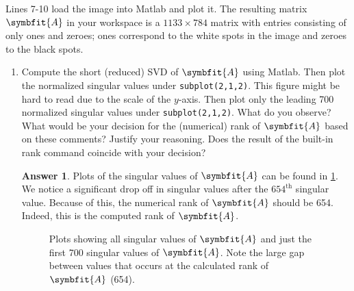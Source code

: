 \documentclass{article}
\theoremstyle{definition}
\newtheorem*{answer}{Answer}
\newcommand{\mat}[1]{\symbfit{#1}}
\begin{document}
\begin{enumerate}[leftmargin=\labelsep]
	      Lines 7-10 load the image into Matlab and plot it. The resulting matrix \(\mat{A}\) in your workspace is a \(1133 \times 784\) matrix with entries consisting of only ones and zeroes; ones correspond to the white spots in the image and zeroes to the black spots.
	      \begin{enumerate}
		      \item Compute the short (reduced) SVD of \(\mat{A}\) using Matlab. Then plot the normalized singular values under \texttt{subplot(2,1,2)}. This figure might be hard to read due to the scale of the \(y\)-axis. Then plot only the leading 700 normalized singular values under \texttt{subplot(2,1,2)}. What do you observe? What would be your decision for the (numerical) rank of \(\mat{A}\) based on these comments? Justify your reasoning. Does the result of the built-in rank command coincide with your decision?
		            \begin{answer}
			            Plots of the singular values of \(\mat{A}\) can be found in \cref{fig:singvals}. We notice a significant drop off in singular values after the \(654^\text{th}\) singular value. Because of this, the numerical rank of \(\mat{A}\) should be 654. Indeed, this is the computed rank of \(\mat{A}\).
			            \begin{figure}[H]
				            \centering{}
				            \caption{Plots showing all singular values of \(\mat{A}\) and just the first 700 singular values of \(\mat{A}\). Note the large gap between values that occurs at the calculated rank of \(\mat{A}\) (654).}\label{fig:singvals}
			            \end{figure}
		            \end{answer}


\end{enumerate}
\end{enumerate}
\end{document}
